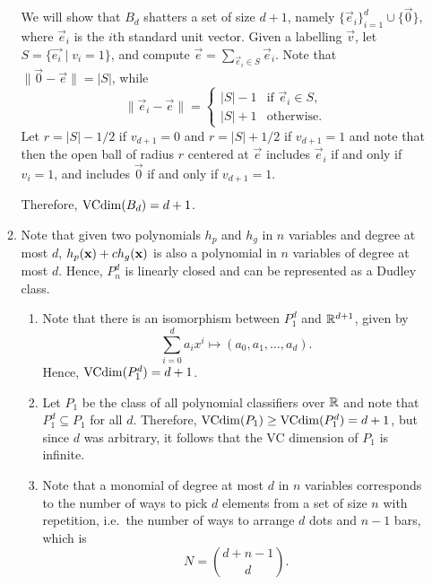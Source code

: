 \begin{ex}
\begin{enumerate}
\begin{enumerate}[1.]
                  We will show that $B_d$ shatters a set of size $d+1$, namely
                  $\{\vec{e}_i\}_{i=1}^{d}\cup\{\vec{0}\}$, where $\vec{e}_i$ is
                  the $i$th standard unit vector. Given a labelling $\vec{v}$,
                  let $S=\{\vec{e_i} \mid v_i=1\}$, and compute
                  $\vec{e}=\sum_{\vec{e}_i\in S} \vec{e}_i$. Note that
                  $\|\vec{0}-\vec{e}\|=|S|$, while
                  \[
                    \|\vec{e}_i-\vec{e}\|=\begin{cases}
                      |S|-1 & \text{if $\vec{e}_i\in S$}, \\
                      |S|+1 & \text{otherwise}.
                    \end{cases}
                  \]
                  Let $r=|S|-1/2$ if $v_{d+1}=0$ and $r=|S|+1/2$ if $v_{d+1}=1$
                  and note that then the open ball of radius $r$ centered at
                  $\vec{e}$ includes $\vec{e}_i$ if and only if $v_i=1$, and
                  includes $\vec{0}$ if and only if $v_{d+1}=1$.

                  Therefore, $\operatorname{VCdim}(B_d)=d+1$.
            \item Note that given two polynomials $h_p$ and $h_g$ in $n$
                  variables and degree at most $d$, $h_p(\mathbf{x})+ch_g(\mathbf{x})$ is also
                  a polynomial in $n$ variables of degree at most $d$. Hence,
                  $P^d_n$ is linearly closed and can be represented as a Dudley
                  class.
                  \begin{enumerate}[1.]
                    \item Note that there is an isomorphism between $P_1^d$ and
                          $\mathbb{R}^{d+1}$, given by
                          \[
                            \sum_{i=0}^d a_ix^i \mapsto (a_0, a_1, \ldots, a_d).
                          \]
                          Hence, $\operatorname{VCdim}(P_1^d)=d+1$.
                    \item Let $P_1$ be the class of all polynomial classifiers
                          over $\mathbb{R}$ and note that $P_1^d\subseteq P_1$ for all
                          $d$. Therefore, $\operatorname{VCdim}(P_1)\geq \operatorname{VCdim}(P_1^d)=d+1$,
                          but since $d$ was arbitrary, it follows that the VC
                          dimension of $P_1$ is infinite.
                    \item Note that a monomial of degree at most $d$ in $n$
                          variables corresponds to the number of ways to pick
                          $d$ elements from a set of size $n$ with repetition,
                          i.e.\ the number of ways to arrange $d$ dots and $n-1$
                          bars, which is
                          \[
                            N=\binom{d+n-1}{d}.
                          \]


\end{enumerate}
\end{enumerate}
\end{enumerate}
\end{ex}
